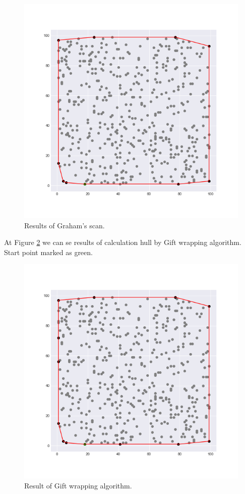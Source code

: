\documentclass[a4paper,article,14pt]{extarticle}
\begin{document}
	\begin{figure}[h!]
		\centering
		\includegraphics[scale=0.5]{graham.png}
		\caption{Results of Graham's scan.}
		\label{graham}
	\end{figure}
	
	At Figure \ref{gift} we can se results of calculation hull by Gift wrapping algorithm. Start point marked as green.

	\begin{figure}[h!]
		\centering
		\includegraphics[scale=0.5]{gift.png}
		\caption{Result of Gift wrapping algorithm.}
		\label{gift}
	\end{figure} 
	
\end{document}

